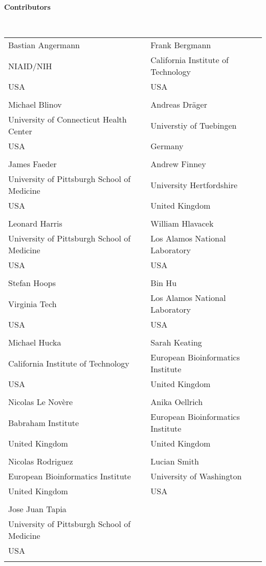 
\begin{large}\textbf{Contributors}\end{large} \\
\begin{center}
  \begin{tabular}{l @{\hspace{20 pt}} l}
  Bastian Angermann				& Frank Bergmann \\[0.25em]
  NIAID/NIH		     			& California Institute of Technology \\
  USA						& USA \\
  \\
  Michael Blinov			   	& Andreas Dr\"ager \\[0.25em]
  University of Connecticut Health Center  	& Universtiy of Tuebingen \\
  USA     				   	& Germany \\
  \\
  James Faeder 					& Andrew Finney \\[0.25em]
  University of Pittsburgh School of Medicine	& University Hertfordshire \\
  USA						& United Kingdom \\
  \\
  Leonard Harris 				& William Hlavacek \\[0.25em]
  University of Pittsburgh School of Medicine	& Los Alamos National Laboratory \\
  USA						& USA\\
  \\
  Stefan Hoops 					& Bin Hu \\[0.25em]
  Virginia Tech 				& Los Alamos National Laboratory \\
  USA	 					& USA \\
  \\
  Michael Hucka 				& Sarah Keating\\[0.25em]
  California Institute of Technology		& European Bioinformatics Institute \\
  USA						& United Kingdom \\
  \\
  Nicolas Le Nov\`ere				& Anika Oellrich \\[0.25em]
  Babraham Institute				& European Bioinformatics Institute \\
  United Kingdom				& United Kingdom \\
  \\
  Nicolas Rodriguez 				& Lucian Smith \\[0.25em]
  European Bioinformatics Institute		& University of Washington\\
  United Kingdom				& USA\\
  \\
  Jose Juan Tapia				& \\[0.25em]
  University of Pittsburgh School of Medicine	& \\
  USA						& \\
  \\
  \end{tabular}
\end{center}
  

